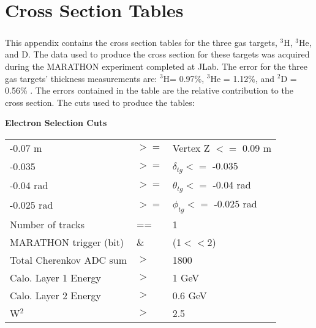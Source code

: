 \chapter{Cross Section Tables}\label{CST}
\paragraph{}This appendix contains the cross section tables for the three gas targets, $^3$H, $^3$He, and D. The data used to produce the cross section for these targets was acquired during the MARATHON experiment completed at JLab. The error for the three gas targets' thickness measurements are: $^3$H= 0.97\%, $^3$He = 1.12\%, and $^2$D = 0.56\% \cite{HATT_eng}. The errors contained in the table are the relative contribution to the cross section. The cuts used to produce the tables:

\textbf{Electron Selection Cuts}\\
\begin{tabular}{@{$\bullet$ }lll}
	-0.07 m &$>=$& Vertex Z $<=$ 0.09 m\\
	-0.035 &$ >=$ &$\delta_{tg} <=$ -0.035\\
	-0.04 rad &$>=$  &$\theta_{tg} <=$ -0.04 rad\\
	-0.025 rad &$>=$  &$\phi_{tg}   <=$ -0.025 rad\\
	Number of tracks & ==& 1\\
	MARATHON trigger (bit)  &\& &(1$<<$2)\\
	Total Cherenkov ADC sum &$>$ &1800\\
	Calo. Layer 1 Energy &$>$ & 1 GeV\\
	Calo. Layer 2 Energy &$>$ & 0.6 GeV\\
		W$^2$ &$>$ &2.5
\end{tabular}

